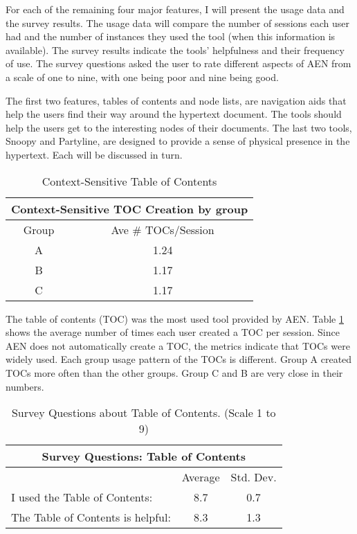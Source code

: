 For each of the remaining four major features, I will present the usage
data and the survey results.  The usage data will compare the number of
sessions each user had and the number of instances they used the tool (when
this information is available).  The survey results indicate the tools'
helpfulness and their frequency of use.  The survey questions asked the
user to rate different aspects of AEN from a scale of one to nine, with one
being poor and nine being good.

The first two features, tables of contents and node lists, are
navigation aids that help the users find their way around the hypertext
document.  The tools should help the users get to the interesting nodes of
their documents.  The last two tools, Snoopy and Partyline, are designed to
provide a sense of physical presence in the hypertext.  Each will be
discussed in turn.

\small
\begin{table}[htb]
  \caption{Context-Sensitive Table of Contents}
  \begin{center}
    \begin{tabular}{|c|c|}
      \hline
      \multicolumn{2}{|c|}{\rule[-3mm]{0mm}{8mm}\bf Context-Sensitive TOC Creation by group}\\ 
      \hline
      Group&Ave \# TOCs/Session\\ \hline
      \hline
      A&1.24\\ \hline
      B&1.17\\ \hline
      C&1.17\\ \hline
    \end{tabular}
  \end{center}
  \label{tab:TOC}
\end{table}
\normalsize

The table of contents (TOC) was the most used tool provided by AEN.  Table
\ref{tab:TOC} shows the average number of times each user created a TOC per
session.  Since AEN does not automatically create a TOC, the metrics
indicate that TOCs were widely used.  Each group usage pattern of the TOCs
is different.  Group A created TOCs more often than the other groups.
Group C and B are very close in their numbers.


\small
\begin{table}
  \caption{Survey Questions about Table of Contents. (Scale 1 to 9)}
  \begin{center}
    \begin{tabular}{|l|c|c|}
      \hline
      \multicolumn{3}{|c|}{\rule[-3mm]{0mm}{8mm}\bf Survey Questions:
      Table of Contents}\\ \hline
      &Average&Std. Dev.\\ \hline
      I used the Table of Contents:&8.7&0.7\\ \hline
      The Table of Contents is helpful:&8.3&1.3\\ \hline
    \end{tabular}
  \end{center}
  \label{tab:survey-TOC}
\end{table}
\normalsize

